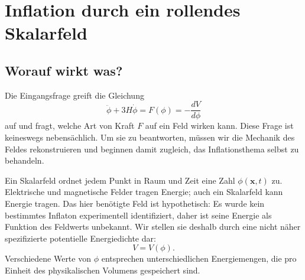 \chapter{Inflation durch ein rollendes Skalarfeld}


\section{Worauf wirkt was?}

Die Eingangsfrage greift die Gleichung
\begin{equation}
\ddot\phi+3H\dot\phi
=F(\phi)
=-\frac{dV}{d\phi}
\label{eq:c09-opening}
\end{equation}auf und fragt, welche Art von Kraft \(F\) auf ein Feld wirken kann. Diese Frage ist keineswegs nebensächlich. Um sie zu beantworten, müssen wir die Mechanik des Feldes rekonstruieren und beginnen damit zugleich, das Inflationsthema selbst zu behandeln.

Ein Skalarfeld ordnet jedem Punkt in Raum und Zeit eine Zahl \(\phi(\mathbf x,t)\) zu. Elektrische und magnetische Felder tragen Energie; auch ein Skalarfeld kann Energie tragen. Das hier benötigte Feld ist hypothetisch: Es wurde kein bestimmtes Inflaton experimentell identifiziert, daher ist seine Energie als Funktion des Feldwerts unbekannt. Wir stellen sie deshalb durch eine nicht näher spezifizierte potentielle Energiedichte dar:
\begin{equation}
V=V(\phi).
\label{eq:c09-potential}
\end{equation}
Verschiedene Werte von \(\phi\) entsprechen unterschiedlichen Energiemengen, die pro Einheit des physikalischen Volumens gespeichert sind.


